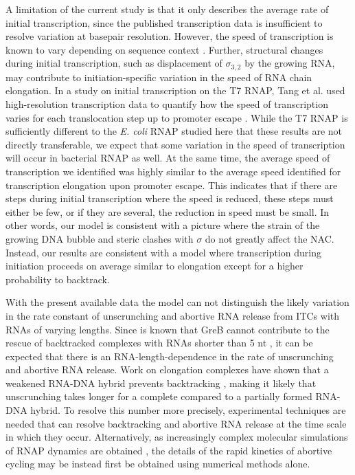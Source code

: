 A limitation of the current study is that it only describes the average rate
of initial transcription, since the published transcription data is
insufficient to resolve variation at basepair resolution. However, the speed
of transcription is known to vary depending on sequence context
\cite{bai_mechanochemical_2007,malinen_active_2012}. Further, structural
changes during initial transcription, such as displacement of $\sigma_{3,2}$
by the growing RNA, may contribute to initiation-specific variation in the
speed of RNA chain elongation. In a study on initial transcription on the T7
RNAP, Tang et al. used high-resolution transcription data to quantify how the
speed of transcription varies for each translocation step up to promoter
escape \cite{tang_real-time_2009}. While the T7 RNAP is sufficiently different
to the \textit{E. coli} RNAP studied here that these results are not directly
transferable, we expect that some variation in the speed of transcription will
occur in bacterial RNAP as well. At the same time, the average speed of
transcription we identified was highly similar to the average speed identified
for transcription elongation upon promoter escape. This indicates that if
there are steps during initial transcription where the speed is reduced, these
steps must either be few, or if they are several, the reduction in speed must
be small. In other words, our model is consistent with a picture where the
strain of the growing DNA bubble and steric clashes with $\sigma$ do not
greatly affect the NAC. Instead, our results are consistent with a model
where transcription during initiation proceeds on average similar to
elongation except for a higher probability to backtrack.

With the present available data the model can not distinguish the likely
variation in the rate constant of unscrunching and abortive RNA release from
ITCs with RNAs of varying lengths. Since is known that GreB cannot contribute to
the rescue of backtracked complexes with RNAs shorter than 5 nt
\cite{hsu_initial_2006}, it can be expected that there is an
RNA-length-dependence in the rate of unscrunching and abortive RNA release.
Work on elongation complexes have shown that a weakened RNA-DNA hybrid
prevents backtracking \cite{nudler_rnadna_1997}, making it likely that
unscrunching takes longer for a complete compared to a partially formed
RNA-DNA hybrid. To resolve this number more precisely, experimental techniques
are needed that can resolve backtracking and abortive RNA release at the time
scale in which they occur. Alternatively, as increasingly complex molecular
simulations of RNAP dynamics are obtained \cite{silva_millisecond_2014}, the
details of the rapid kinetics of abortive cycling may be instead first be
obtained using numerical methods alone.

